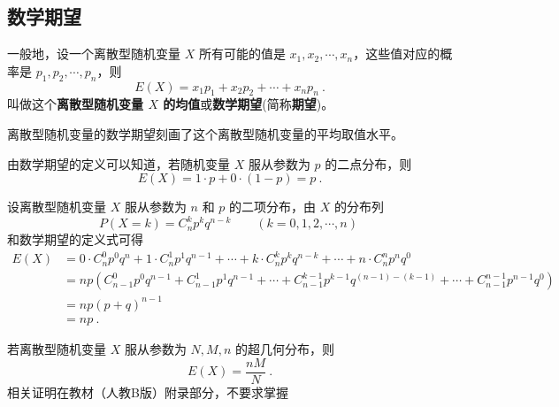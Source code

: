 
\subsection{数学期望}
一般地，设一个离散型随机变量 $X$ 所有可能的值是 $x_1,x_2,\cdots,x_n$，这些值对应的概率是 $p_1,p_2,\cdots,p_n$，则
\begin{equation}
E(X) = x_1p_1 + x_2p_2 + \cdots + x_np_n~.
\end{equation}
叫做这个\textbf{离散型随机变量 $X$ 的均值}或\textbf{数学期望}(简称\textbf{期望})。

离散型随机变量的数学期望刻画了这个离散型随机变量的平均取值水平。

由数学期望的定义可以知道，若随机变量 $X$ 服从参数为 $p$ 的二点分布，则
\begin{equation}
E(X) = 1 \cdot p + 0 \cdot(1 - p) = p~.
\end{equation}

设离散型随机变量 $X$ 服从参数为 $n$ 和 $p$ 的二项分布，由 $X$ 的分布列
\begin{equation}
P(X = k) = C_n^kp^kq^{n-k} \qquad (k=0,1,2,\cdots ,n)~
\end{equation}
和数学期望的定义式可得
\begin{equation}
\begin{aligned}
E(X) &= 0\cdot C_n^0p^0q^n+1\cdot C_n^1p^1q^{n-1}+\cdots +k\cdot C_n^kp^kq^{n-k}+\cdots +n\cdot C_n^np^nq^0 \\
&= np(C_{n-1}^0p^0q^{n-1}+C_{n-1}^1p^1q^{n-1}+\cdots +C_{n-1}^{k-1}p^{k-1}q^{(n-1)-(k-1)}+\cdots+C_{n-1}^{n-1}p^{n-1}q^0) \\
&= np(p+q)^{n-1} \\
&= np~.
\end{aligned}
\end{equation}

若离散型随机变量 $X$ 服从参数为 $N,M,n$ 的超几何分布，则
\begin{equation}
E(X) = \frac{nM}{N}~.
\end{equation}
相关证明在教材（人教B版）附录部分，不要求掌握
